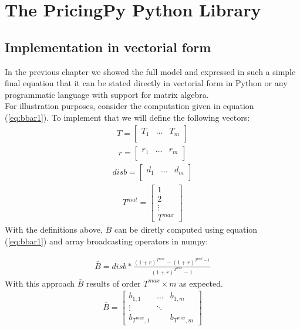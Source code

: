 

\chapter{The PricingPy Python Library}
\section{Implementation in vectorial form}
In the previous chapter we showed the full model and expressed in such a simple final equation that it can be stated directly in vectorial form in Python or any programmatic language with support for matrix algebra.\\

For illustration purposes, consider the computation given in equation (\ref{eq:bbar1}). To implement that we will define the following vectors:
\begin{align}
T = \begin{bmatrix} 
    T_{1} & \dots &  T_{m} \\
    \end{bmatrix}    
\end{align}
\begin{align}
r = \begin{bmatrix} 
    r_{1} & \dots &  r_{m} \\
    \end{bmatrix}    
\end{align}
\begin{align}
disb = \begin{bmatrix} 
    d_{1} & \dots &  d_{m} \\
    \end{bmatrix}    
\end{align}
\begin{align}
T^{mat} = \begin{bmatrix} 
     1  \\
     2  \\
    \vdots  \\
    T^{max} 
    \end{bmatrix}       
\end{align}
With the definitions above, $\bar{B}$ can be diretly computed using equation (\ref{eq:bbar1}) and array broadcasting operators in numpy:

\begin{align}
    \bar{B} = disb*\frac{(1+r)^{T^{max}}-(1+r)^{T^{mat}-1}}{(1+r)^{T^{max}}-1}
\end{align}
With this approach $\bar{B}$ results of order $T^{max}\times m$ as expected.
\begin{align}
\bar{B} = \begin{bmatrix} 
    b_{1,1} & \dots &  b_{1,m} \\
    \vdots & \ddots & \\
    b_{T^{max},1} &        & b_{T^{max},m} 
    \end{bmatrix}    
\end{align}
